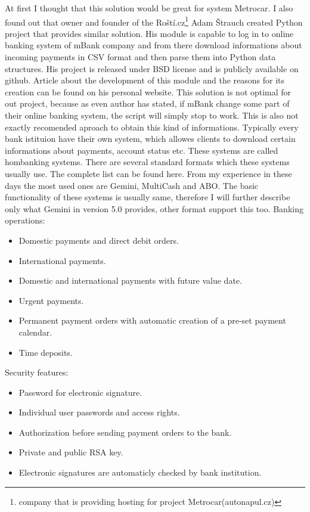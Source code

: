 \documentclass[11pt,twoside,a4paper]{book}
\begin{document}
At first I thought that this solution would be great for system Metrocar. I also found out that owner and founder of the Roští.cz\footnote{company that is providing hosting for project Metrocar(autonapul.cz)} Adam Štrauch created Python project that provides similar solution. His module is capable to log in to online banking system of mBank company and from there download informations about incoming payments in CSV format and then parse them into Python data structures. His project is released under BSD license and is publicly available on github\cite{python-mbank}. Article about the development of this module and the reasons for its creation can be found on his personal website\cite{mbank}. This solution is not optimal for out project, because as even author has stated, if mBank change some part of their 
online banking system, the script will simply stop to work. This is also not exactly recomended aproach to obtain this kind of 
informations. Typically every bank istituion have their own system, which allowes clients to download certain informations about payments, account status etc. These systems are called hombanking systems. There are several standard formats which 
these systems usually use. The complete list can be found here\cite{hombanking}. From my experience in these days the most used ones are Gemini, MultiCash and ABO. The basic functionality of these systems is usually same, therefore I will further describe only what Gemini in version 5.0 provides, other format support this too. 
Banking operations:
\begin{itemize}
 \item Domestic payments and direct debit orders.
 \item International payments.
 \item Domestic and international payments with future value date.
 \item Urgent payments.
 \item Permanent payment orders with automatic creation of a pre-set payment calendar.
 \item Time deposits.
\end{itemize}

Security features:
\begin{itemize}
	\item Password for electronic signature.
	\item Individual user passwords and access rights.
	\item Authorization before sending payment orders to the bank.
	\item Private and public RSA key.
	\item Electronic signatures are automaticly checked by bank institution.
\end{itemize}
\end{document}
